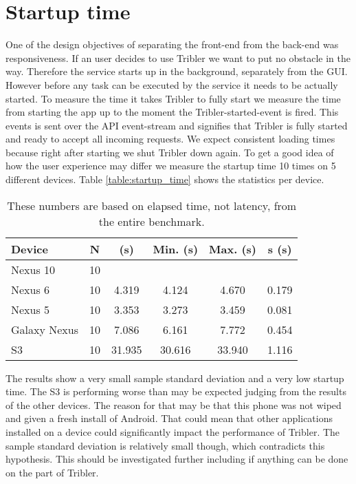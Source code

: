 \section{Startup time}
One of the design objectives of separating the front-end from the back-end was responsiveness.
If an user decides to use Tribler we want to put no obstacle in the way.
Therefore the service starts up in the background, separately from the GUI.
However before any task can be executed by the service it needs to be actually started.
To measure the time it takes Tribler to fully start we measure the time from starting the app up to the moment the Tribler-started-event is fired.
This events is sent over the API event-stream and signifies that Tribler is fully started and ready to accept all incoming requests.
We expect consistent loading times because right after starting we shut Tribler down again.
To get a good idea of how the user experience may differ we measure the startup time 10 times on 5 different devices.
Table \ref{table:startup_time} shows the statistics per device.
\begin{table}[h]
	\begin{tabular}{l | *{5}{c}}
		Device & N & \overline{x} (s) & Min. (s) & Max. (s) & s (s) \\ \hline
		Nexus 10        & 10 & \\ \hline
		Nexus 6          & 10 & 4.319 & 4.124 & 4.670 & 0.179 \\ \hline
		Nexus 5          & 10 & 3.353 & 3.273 & 3.459 & 0.081 \\ \hline
		Galaxy Nexus & 10 & 7.086 & 6.161 & 7.772 & 0.454 \\ \hline
		S3                   & 10 & 31.935 & 30.616 & 33.940 & 1.116 \\ \hline
	\end{tabular}
	\caption[Total response time statistics]{These numbers are based on elapsed time, not latency, from the entire benchmark.}
	\label{table:starup_time}
\end{table}
The results show a very small sample standard deviation and a very low startup time.
The S3 is performing worse than may be expected judging from the results of the other devices.
The reason for that may be that this phone was not wiped and given a fresh install of Android.
That could mean that other applications installed on a device could significantly impact the performance of Tribler.
The sample standard deviation is relatively small though, which contradicts this hypothesis.
This should be investigated further including if anything can be done on the part of Tribler.



